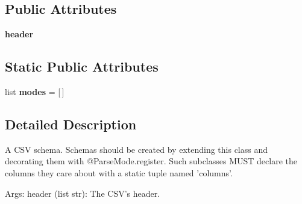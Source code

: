 \subsection*{Public Attributes}
\begin{DoxyCompactItemize}
\item 
\hypertarget{classscheduler_1_1csv__parser_1_1_parse_mode_a13cc81cc8f8e63d9aca98934beda8c67}{{\bfseries header}}\label{classscheduler_1_1csv__parser_1_1_parse_mode_a13cc81cc8f8e63d9aca98934beda8c67}

\end{DoxyCompactItemize}
\subsection*{Static Public Attributes}
\begin{DoxyCompactItemize}
\item 
\hypertarget{classscheduler_1_1csv__parser_1_1_parse_mode_a649baaf5bb93b19ddf00ace72debf871}{list {\bfseries modes} = \mbox{[}$\,$\mbox{]}}\label{classscheduler_1_1csv__parser_1_1_parse_mode_a649baaf5bb93b19ddf00ace72debf871}

\end{DoxyCompactItemize}


\subsection{Detailed Description}
\begin{DoxyVerb}A CSV schema. Schemas should be created by extending this class
and decorating them with @ParseMode.register. Such subclasses MUST
declare the columns they care about with a static tuple named
'columns'.

Args:
    header (list str): The CSV's header.
\end{DoxyVerb}
 

